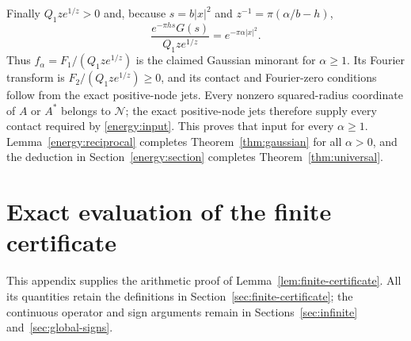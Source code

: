 \documentclass[11pt]{article}
\theoremstyle{remark}\newtheorem{remark}[theorem]{Remark}
\begin{document}
Finally $Q_1ze^{1/z}>0$ and, because
$s=b|x|^2$ and $z^{-1}=\pi(\alpha/b-h)$,
\[
 \frac{e^{-\pi hs}G(s)}{Q_1ze^{1/z}}
       =e^{-\pi\alpha|x|^2}.
\]
Thus $f_\alpha=F_1/(Q_1ze^{1/z})$ is the claimed Gaussian
minorant for $\alpha\ge1$.  Its Fourier transform is
$F_2/(Q_1ze^{1/z})\ge0$, and its contact and Fourier-zero
conditions follow from the exact positive-node jets.
Every nonzero squared-radius coordinate of $A$ or $A^*$ belongs to
$\mathcal N$; the exact positive-node jets therefore supply every
contact required by \eqref{energy:input}. This proves that input for every
$\alpha\ge1$.
Lemma~\ref{energy:reciprocal} completes Theorem~\ref{thm:gaussian} for
all $\alpha>0$, and the deduction in Section~\ref{energy:section}
completes Theorem~\ref{thm:universal}.

\appendix
\section{Exact evaluation of the finite certificate}
\label{app:finite-certificate}

This appendix supplies the arithmetic proof of
Lemma~\ref{lem:finite-certificate}. All its quantities retain the
definitions in Section~\ref{sec:finite-certificate}; the continuous
operator and sign arguments remain in Sections~\ref{sec:infinite}
and~\ref{sec:global-signs}.
\end{document}
